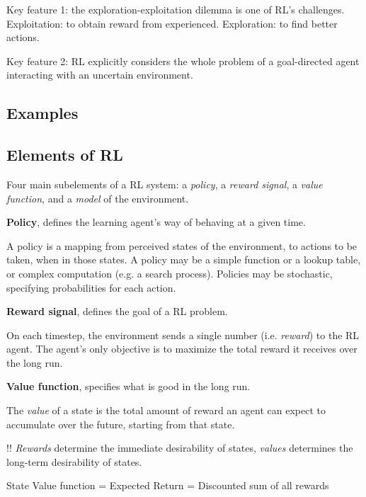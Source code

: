 \documentclass[lang=en,mode=geye,device=normal,color=blue,14pt]{elegantnote}
\DeclareMathOperator*{\1}{\mathbbm{1}}
\begin{document}
Key feature 1: the exploration-exploitation dilemma is one of RL's challenges.
Exploitation: to obtain reward from experienced.
Exploration: to find better actions.

Key feature 2: RL explicitly considers the whole problem of a goal-directed agent interacting with an uncertain environment.

\subsection{Examples}
\subsection{Elements of RL}

Four main subelements of a RL system: a \textit{policy}, a \textit{reward signal}, a \textit{value function}, and a \textit{model} of the environment.

\begin{definition}
\textbf{Policy}, defines the learning agent's way of behaving at a given time.
\end{definition}

A policy is a mapping from perceived states of the environment, to actions to be taken, when in those states.
A policy may be a simple function or a lookup table, or complex computation (e.g. a search process).
Policies may be stochastic, specifying probabilities for each action.

\begin{definition}
\textbf{Reward signal}, defines the goal of a RL problem.
\end{definition}

On each timestep, the environment sends a single number (i.e. \textit{reward}) to the RL agent. The agent's only objective is to maximize the total reward it receives over the long run.

\begin{definition}
\textbf{Value function}, specifies what is good in the long run.
\end{definition}

The \textit{value} of a state is the total amount of reward an agent can expect to accumulate over the future, starting from that state.

!! \textit{Rewards} determine the immediate desirability of states, \textit{values} determines the long-term desirability of states.

State Value function = Expected Return = Discounted sum of all rewards
\end{document}
